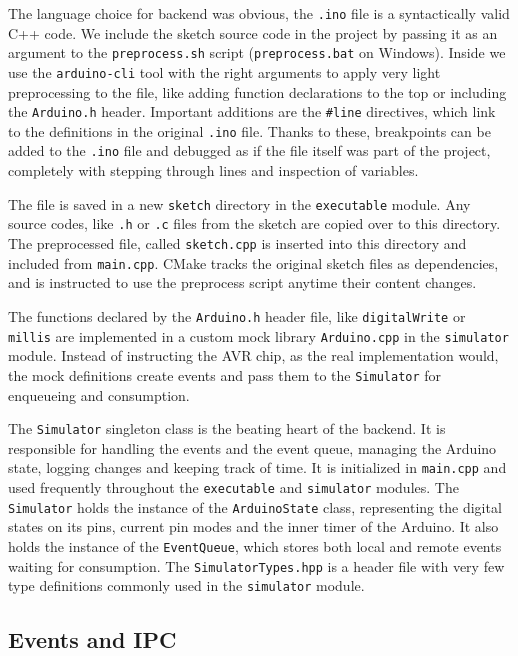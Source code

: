 The language choice for backend was obvious, the \texttt{.ino} file is a syntactically valid C++ code. We include the sketch source code in the project by passing it as an argument to the \texttt{preprocess.sh} script (\texttt{preprocess.bat} on Windows). Inside we use the \texttt{arduino-cli} tool with the right arguments to apply very light preprocessing to the file, like adding function declarations to the top or including the \texttt{Arduino.h} header. Important additions are the \texttt{\#line} directives, which link to the definitions in the original \texttt{.ino} file. Thanks to these, breakpoints can be added to the \texttt{.ino} file and debugged as if the file itself was part of the project, completely with stepping through lines and inspection of variables. 

The file is saved in a new \texttt{sketch} directory in the \texttt{executable} module. Any source codes, like \texttt{.h} or \texttt{.c} files from the sketch are copied over to this directory. The preprocessed file, called \texttt{sketch.cpp} is inserted into this directory and included from \texttt{main.cpp}. CMake tracks the original sketch files as dependencies, and is instructed to use the preprocess script anytime their content changes.

The functions declared by the \texttt{Arduino.h} header file, like \texttt{digitalWrite} or \texttt{millis} are implemented in a custom mock library \texttt{Arduino.cpp} in the \texttt{simulator} module. Instead of instructing the AVR chip, as the real implementation would, the mock definitions create events and pass them to the \texttt{Simulator} for enqueueing and consumption. 

The \texttt{Simulator} singleton class is the beating heart of the backend. It is responsible for handling the events and the event queue, managing the Arduino state, logging changes and keeping track of time. It is initialized in \texttt{main.cpp} and used frequently throughout the \texttt{executable} and \texttt{simulator} modules. The \texttt{Simulator} holds the instance of the \texttt{ArduinoState} class, representing the digital states on its pins, current pin modes and the inner timer of the Arduino. It also holds the instance of the \texttt{EventQueue}, which stores both local and remote events waiting for consumption. The \texttt{SimulatorTypes.hpp} is a header file with very few type definitions commonly used in the \texttt{simulator} module.

\subsection{Events and IPC}\label{subsec:cpp-events}

